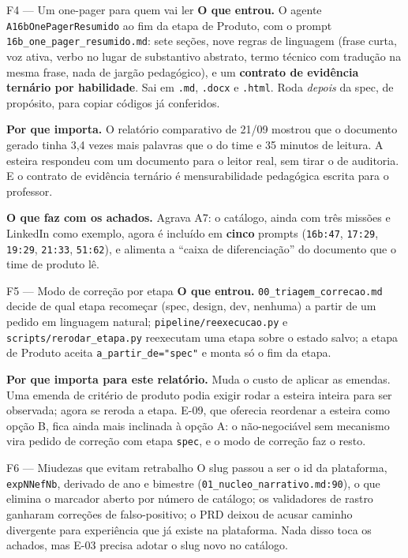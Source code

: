 \documentclass[11pt,a4paper]{article}
\begin{document}
\begin{creditobox}{F4 --- Um one-pager para quem vai ler}
\textbf{O que entrou.} O agente \texttt{A16bOnePagerResumido} ao fim da etapa de Produto, com o
prompt \texttt{16b\_one\_pager\_resumido.md}: sete seções, nove regras de linguagem (frase curta, voz
ativa, verbo no lugar de substantivo abstrato, termo técnico com tradução na mesma frase, nada de
jargão pedagógico), e um \textbf{contrato de evidência ternário por habilidade}. Sai em
\texttt{.md}, \texttt{.docx} e \texttt{.html}. Roda \emph{depois} da spec, de propósito, para copiar
códigos já conferidos.

\textbf{Por que importa.} O relatório comparativo de 21/09 mostrou que o documento gerado tinha 3,4
vezes mais palavras que o do time e 35 minutos de leitura. A esteira respondeu com um documento para
o leitor real, sem tirar o de auditoria. E o contrato de evidência ternário é mensurabilidade
pedagógica escrita para o professor.

\textbf{O que faz com os achados.} Agrava A7: o catálogo, ainda com três missões e LinkedIn como
exemplo, agora é incluído em \textbf{cinco} prompts (\texttt{16b:47}, \texttt{17:29},
\texttt{19:29}, \texttt{21:33}, \texttt{51:62}), e alimenta a ``caixa de diferenciação'' do documento
que o time de produto lê.
\end{creditobox}

\begin{creditobox}{F5 --- Modo de correção por etapa}
\textbf{O que entrou.} \texttt{00\_triagem\_correcao.md} decide de qual etapa recomeçar (spec, design,
dev, nenhuma) a partir de um pedido em linguagem natural; \texttt{pipeline/reexecucao.py} e
\texttt{scripts/rerodar\_etapa.py} reexecutam uma etapa sobre o estado salvo; a etapa de Produto
aceita \texttt{a\_partir\_de="spec"} e monta só o fim da etapa.

\textbf{Por que importa para este relatório.} Muda o custo de aplicar as emendas. Uma emenda de
critério de produto podia exigir rodar a esteira inteira para ser observada; agora se reroda a etapa.
E-09, que oferecia reordenar a esteira como opção B, fica ainda mais inclinada à opção A: o
não-negociável sem mecanismo vira pedido de correção com etapa \texttt{spec}, e o modo de correção
faz o resto.
\end{creditobox}

\begin{creditobox}{F6 --- Miudezas que evitam retrabalho}
O slug passou a ser o id da plataforma, \texttt{expNNefNb}, derivado de ano e bimestre
(\texttt{01\_nucleo\_narrativo.md:90}), o que elimina o marcador aberto por número de catálogo; os
validadores de rastro ganharam correções de falso-positivo; o PRD deixou de acusar caminho divergente
para experiência que já existe na plataforma. Nada disso toca os achados, mas E-03 precisa adotar o
slug novo no catálogo.
\end{creditobox}
\end{document}
